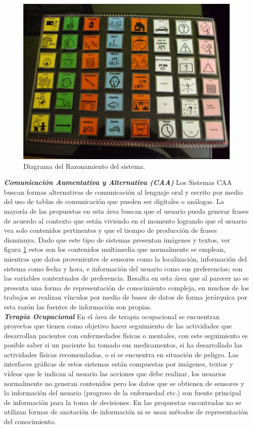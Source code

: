 \begin{figure}[ht]
\centering%
\includegraphics[width=.5\textwidth]{Cap4/tablero_convencional}%
\caption{Diagrama del Razonamiento del sistema.} \label{fig:CAA}
\end{figure}


\textbf{\textit{Comunicación Aumentativa y Alternativa (CAA)}} Los Sistemas CAA buscan formas alternativas de comunicación al lenguaje oral y escrito por medio del uso de tablas de comunicación que pueden ser digitales o análogas. La mayoría de las propuestas en esta área buscan que el usuario pueda generar frases de acuerdo al contexto que están viviendo en el momento logrando que el usuario vea solo contenidos pertinentes y que el tiempo de producción de frases disminuya. Dado que este tipo de sistemas presentan imágenes y textos, ver figura \ref{fig:CAA} estos son los contenidos multimedia que normalmente se emplean, mientras que datos provenientes de sensores como la localización, información del sistema como fecha y hora, e información del usuario como sus preferencias; son las variables contextuales de preferencia.
Resalta en esta área que al parecer no se presenta una forma de representación de conocimiento compleja, en muchos de los trabajos se realizan vínculos por medio de bases de datos de forma jerárquica por esta razón las fuentes de información son propias.\\

\textbf{\textit{Terapia Ocupacional}} En el área de terapia ocupacional se encuentran proyectos que tienen como objetivo hacer seguimiento de las actividades que desarrollan pacientes con enfermedades físicas o mentales, con este seguimiento es posible saber si un paciente ha tomado sus medicamentos, si ha desarrollado las actividades físicas recomendadas, o si se encuentra en situación de peligro. Las interfaces gráficas de estos sistemas están compuestas por imágenes, textos y vídeos que le indican al usuario las acciones que debe realizar, los usuarios normalmente no generan contenidos pero los datos que se obtienen de sensores y la información del usuario (progreso de la enfermedad etc.) son fuente principal de información para la toma de decisiones. En las propuestas encontradas no se utilizan formas de anotación de información ni se usan métodos de representación del conocimiento.\\

